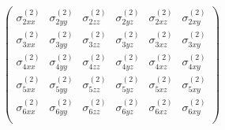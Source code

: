\begin{equation*}
\begin{pmatrix}
\sigma_{2xx}^{\left(2\right)}&\sigma_{2yy}^{\left(2\right)}&\sigma_{2zz}^{\left(2\right)}&\sigma_{2yz}^{\left(2\right)}&\sigma_{2xz}^{\left(2\right)}&\sigma_{2xy}^{\left(2\right)} \\
\sigma_{3xx}^{\left(2\right)}&\sigma_{3yy}^{\left(2\right)}&\sigma_{3zz}^{\left(2\right)}&\sigma_{3yz}^{\left(2\right)}&\sigma_{3xz}^{\left(2\right)}&\sigma_{3xy}^{\left(2\right)} \\
\sigma_{4xx}^{\left(2\right)}&\sigma_{4yy}^{\left(2\right)}&\sigma_{4zz}^{\left(2\right)}&\sigma_{4yz}^{\left(2\right)}&\sigma_{4xz}^{\left(2\right)}&\sigma_{4xy}^{\left(2\right)} \\
\sigma_{5xx}^{\left(2\right)}&\sigma_{5yy}^{\left(2\right)}&\sigma_{5zz}^{\left(2\right)}&\sigma_{5yz}^{\left(2\right)}&\sigma_{5xz}^{\left(2\right)}&\sigma_{5xy}^{\left(2\right)} \\
\sigma_{6xx}^{\left(2\right)}&\sigma_{6yy}^{\left(2\right)}&\sigma_{6zz}^{\left(2\right)}&\sigma_{6yz}^{\left(2\right)}&\sigma_{6xz}^{\left(2\right)}&\sigma_{6xy}^{\left(2\right)} \\
\end{pmatrix} 
\end{equation*}

